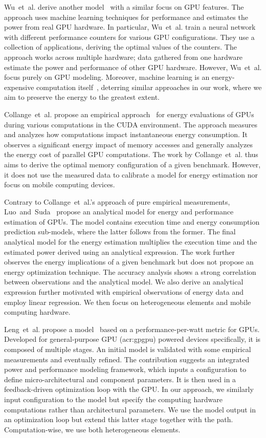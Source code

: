 Wu~et~al. derive another model~\citep{wu2015gpgpu} with a similar focus on GPU features. The approach uses machine learning techniques for performance and estimates the power from real GPU hardware. In particular, Wu~et~al. train a neural network with different performance counters for various GPU configurations. They use a collection of applications, deriving the optimal values of the counters. The approach works across multiple hardware; data gathered from one hardware estimate the power and performance of other GPU hardware. However, Wu~et~al. focus purely on GPU modeling. Moreover, machine learning is an energy-expensive computation itself~\citep{garcia2019estimation,yang2017method}, deterring similar approaches in our work, where we aim to preserve the energy to the greatest extent.

Collange~et~al. propose an empirical approach~\citep{collange2009power} for energy evaluations of GPUs during various computations in the CUDA environment. The approach measures and analyzes how computations impact instantaneous energy consumption. It observes a significant energy impact of memory accesses and generally analyzes the energy cost of parallel GPU computations. The work by Collange~et~al. thus aims to derive the optimal memory configuration of a given benchmark. However, it does not use the measured data to calibrate a model for energy estimation nor focus on mobile computing devices.

Contrary to Collange~et~al.'s approach of pure empirical measurements, Luo~and~Suda~\citep{luo2011performance} propose an analytical model for energy and performance estimation of GPUs. The model contains execution time and energy consumption prediction sub-models, where the latter follows from the former. The final analytical model for the energy estimation multiplies the execution time and the estimated power derived using an analytical expression. The work further observes the energy implications of a given benchmark but does not propose an energy optimization technique. The accuracy analysis
shows a strong correlation between observations and the analytical model. We also derive an analytical expression further motivated with empirical observations of energy data and employ linear regression. We then focus on heterogeneous elements and mobile computing hardware.

Leng~et~al. propose a model~\citep{leng2013gpuwattch} based on a performance-per-watt metric for GPUs. Developed for general-purpose GPU (\Gls{acr:gpgpu}) powered devices specifically, it is composed of multiple stages. An initial model is validated with some empirical measurements and eventually refined.  The contribution suggests an integrated power and performance modeling framework, which inputs a configuration to define micro-architectural and component parameters. It is then used in a feedback-driven optimization loop with the GPU. In our approach, we similarly input configuration to the model but specify the computing hardware computations rather than architectural parameters. We use the model output in an optimization loop but extend this latter stage together with the path. Computation-wise, we use both heterogeneous elements.

